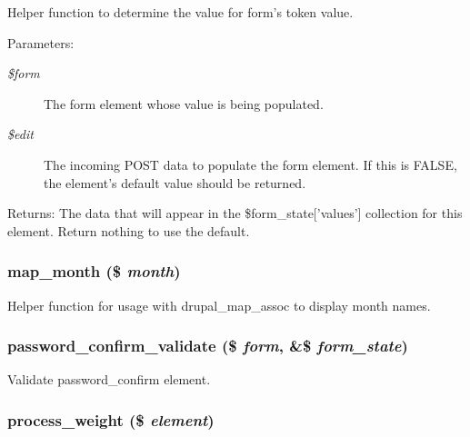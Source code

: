 Helper function to determine the value for form's token value.

\begin{Desc}
\item[Parameters:]
\begin{description}
\item[{\em \$form}]The form element whose value is being populated. \item[{\em \$edit}]The incoming POST data to populate the form element. If this is FALSE, the element's default value should be returned. \end{description}
\end{Desc}
\begin{Desc}
\item[Returns:]The data that will appear in the \$form\_\-state\mbox{[}'values'\mbox{]} collection for this element. Return nothing to use the default. \end{Desc}
\hypertarget{group__form__api_g11e3cb67c8622b662acc4dff61e146a7}{
\subsubsection[{map\_\-month}]{\setlength{\rightskip}{0pt plus 5cm}map\_\-month (\$ {\em month})}}
\label{group__form__api_g11e3cb67c8622b662acc4dff61e146a7}


Helper function for usage with drupal\_\-map\_\-assoc to display month names. \hypertarget{group__form__api_g18b2539d3eb96b30b90f73088051960e}{
\subsubsection[{password\_\-confirm\_\-validate}]{\setlength{\rightskip}{0pt plus 5cm}password\_\-confirm\_\-validate (\$ {\em form}, \/  \&\$ {\em form\_\-state})}}
\label{group__form__api_g18b2539d3eb96b30b90f73088051960e}


Validate password\_\-confirm element. \hypertarget{group__form__api_gf45ceae18e7f0206568fd7985bcfee4d}{
\subsubsection[{process\_\-weight}]{\setlength{\rightskip}{0pt plus 5cm}process\_\-weight (\$ {\em element})}}
\label{group__form__api_gf45ceae18e7f0206568fd7985bcfee4d}


